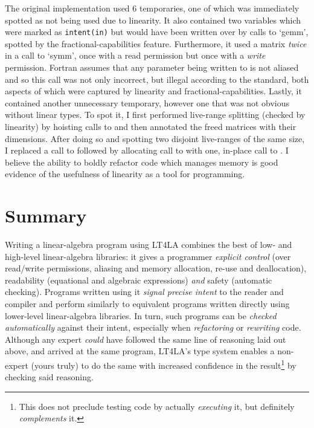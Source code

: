 The original implementation used 6 temporaries, one of which was immediately
spotted as not being used due to linearity. It also contained two variables
which were marked as \texttt{intent(in)} but would have been written over by
calls to `gemm', spotted by the fractional-capabilities feature. Furthermore,
it used a matrix \emph{twice} in a call to `symm', once with a read permission
but once with a \emph{write} permission.  Fortran assumes that any parameter
being written to is not aliased and so this call was not only incorrect, but
illegal according to the standard, both aspects of which were captured by
linearity and fractional-capabilities. Lastly, it contained another unnecessary
temporary, however one that was not obvious without linear types. To spot it, I
first performed live-range splitting (checked by linearity) by hoisting calls
to  and then annotated the freed matrices with their dimensions.
After doing so and spotting two disjoint live-ranges of the same size, I
replaced a call to  followed by allocating call to 
with one, in-place call to . I believe the ability to boldly
refactor code which manages memory is good evidence of the usefulness of
linearity as a tool for programming.

\section{Summary}

Writing a linear-algebra program using LT4LA combines the best of low- and
high-level linear-algebra libraries: it gives a programmer \emph{explicit
control} (over read/write permissions, aliasing and memory allocation, re-use
and deallocation), readability (equational and algebraic expressions)
\emph{and} safety (automatic checking). Programs written using it \emph{signal
precise intent} to the reader and compiler and perform similarly to equivalent
programs written directly using lower-level linear-algebra libraries. In turn,
such programs can be \emph{checked automatically} against their intent,
especially when \emph{refactoring} or \emph{rewriting} code. Although any
expert \emph{could} have followed the same line of reasoning laid out above,
and arrived at the same program, LT4LA's type system enables a non-expert
(yours truly) to do the same with increased confidence in the
result\footnote{This does not preclude testing code by actually
\emph{executing} it, but definitely \emph{complements} it.} by checking said
reasoning.
